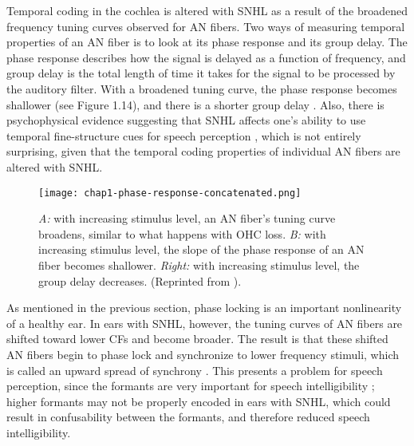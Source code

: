 Temporal coding in the cochlea is altered with SNHL as a result of the broadened frequency tuning curves observed for AN fibers.  Two ways of measuring temporal properties of an AN fiber is to look at its phase response and its group delay.  The phase response describes how the signal is delayed as a function of frequency, and group delay is the total length of time it takes for the signal to be processed by the auditory filter.  With a broadened tuning curve, the phase response becomes shallower (see Figure 1.14), and there is a shorter group delay \cite{Shi2006}.  Also, there is psychophysical evidence suggesting that SNHL affects one's ability to use temporal fine-structure cues for speech perception \cite{Lorenzi2006, Hopkins2008}, which is not entirely surprising, given that the temporal coding properties of individual AN fibers are altered with SNHL.

\begin{figure}[htbp]
\begin{center}
\texttt{[image: chap1-phase-response-concatenated.png]} \\
\caption[AN magnitude and phase response with increasing stimulus level]{\emph{A:} with increasing stimulus level, an AN fiber's tuning curve broadens, similar to what happens with OHC loss.  \emph{B:} with increasing stimulus level, the slope of the phase response of an AN fiber becomes shallower.  \emph{Right:} with increasing stimulus level, the group delay decreases. (Reprinted from ).}
\label{phase-response}
\end{center}
\end{figure}

As mentioned in the previous section, phase locking is an important nonlinearity of a healthy ear.  In ears with SNHL, however, the tuning curves of AN fibers are shifted toward lower CFs and become broader.  The result is that these shifted AN fibers begin to phase lock and synchronize to lower frequency stimuli, which is called an upward spread of synchrony \cite{Miller1997}.  This presents a problem for speech perception, since the formants are very important for speech intelligibility \cite{Peterson1952, Kiefte2010}; higher formants may not be properly encoded in ears with SNHL, which could result in confusability between the formants, and therefore reduced speech intelligibility.

